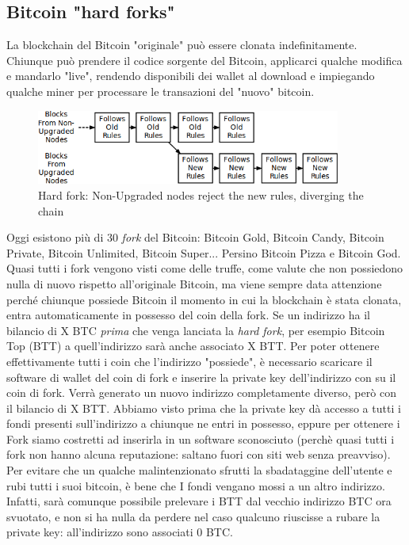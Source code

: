 \documentclass {article}
\begin{document}
{\subsection {Bitcoin "hard forks"}


La blockchain del Bitcoin "originale" può essere clonata indefinitamente. Chiunque può prendere il codice sorgente del Bitcoin, applicarci qualche modifica e mandarlo "live", rendendo disponibili dei wallet al download e impiegando qualche miner per processare le transazioni del "nuovo" bitcoin.

\vspace {0.5cm}
\begin{figure}
\includegraphics [width = 10cm] {hard_fork.png}
\centering
\caption {Hard fork: Non-Upgraded nodes reject the new rules, diverging the chain}
\end{figure}
\vspace {0.2cm}
\noindent
%
Oggi esistono più di 30 \textit{fork} del Bitcoin: Bitcoin Gold, Bitcoin Candy, Bitcoin Private, Bitcoin Unlimited, Bitcoin Super... Persino Bitcoin Pizza e Bitcoin God.
Quasi tutti i fork vengono visti come delle truffe, come valute che non possiedono nulla di nuovo rispetto all'originale Bitcoin, ma viene sempre data attenzione perché chiunque possiede Bitcoin il momento in cui la blockchain è stata clonata, entra automaticamente in possesso del coin della fork.
Se un indirizzo ha il bilancio di X BTC \emph{prima} che venga lanciata la \textit{hard fork}, per esempio Bitcoin Top (BTT) a quell'indirizzo sarà anche associato X BTT.
Per poter ottenere effettivamente tutti i coin che l'indirizzo "possiede", è necessario scaricare il software di wallet del coin di fork e inserire la private key dell'indirizzo con su il coin di fork.
Verrà generato un nuovo indirizzo completamente diverso, però con il bilancio di X BTT.
Abbiamo visto prima che la private key dà accesso a tutti i fondi presenti sull'indirizzo a chiunque ne entri in possesso, eppure per ottenere i Fork siamo costretti ad inserirla in un software sconosciuto (perchè quasi tutti i fork non hanno alcuna reputazione: saltano fuori con siti web senza preavviso).
Per evitare che un qualche malintenzionato sfrutti la sbadataggine dell'utente e rubi tutti i suoi bitcoin, è bene che I fondi vengano mossi a un altro indirizzo.
Infatti, sarà comunque possibile prelevare i BTT dal vecchio indirizzo BTC ora svuotato, e non si ha nulla da perdere nel caso qualcuno riuscisse a rubare la private key: all'indirizzo sono associati 0 BTC.


}
\end{document}
